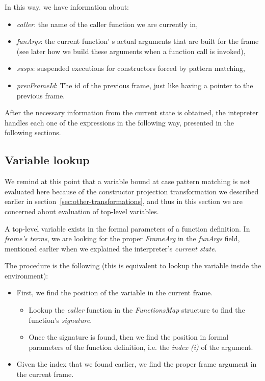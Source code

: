 \documentclass[diploma]{softlab-thesis}
\begin{document}
In this way, we have information about:
\begin{itemize}
  \item \textit{caller}: the name of the caller function we are currently in,
  \item \textit{funArgs}: the current function' s actual arguments that are built for the frame (see later how we build these 
  arguments when a function call is invoked), 
  \item \textit{susps}: suspended executions for constructors forced by pattern matching, 
  \item \textit{prevFrameId}: The id of the previous frame, just like having a pointer to the previous frame.
\end{itemize}

After the necessary information from the current state is obtained, the intepreter handles each one of the expressions
in the following way, presented in the following sections.

\subsection{Variable lookup}

We remind at this point that a variable bound at case pattern matching is not evaluated here because of the constructor 
projection transformation we described earlier in section~\ref{sec:other-transformations}, and thus in this section we are concerned about evaluation 
of top-level variables. 

A top-level variable exists in the formal parameters of a function definition. In \textit{frame's terms}, 
we are looking for the proper \textit{FrameArg} in the \textit{funArgs} field, mentioned earlier when we explained 
the interpreter's \textit{current state}.

The procedure is the following (this is equivalent to lookup the variable inside the environment):
\begin{itemize}
  \item First, we find the position of the variable in the current frame.
  \begin{itemize}
    \item Lookup the \textit{caller} function in the \textit{FunctionsMap} structure to find the function's 
    \textit{signature}.
    \item Once the signature is found, then we find the position in formal parameters of the function definition, 
    i.e. the \textit{index (i)} of the argument.
  \end{itemize} 
  \item Given the index that we found earlier, we find the proper frame argument in the current frame. 
\end{itemize}
\end{document}
